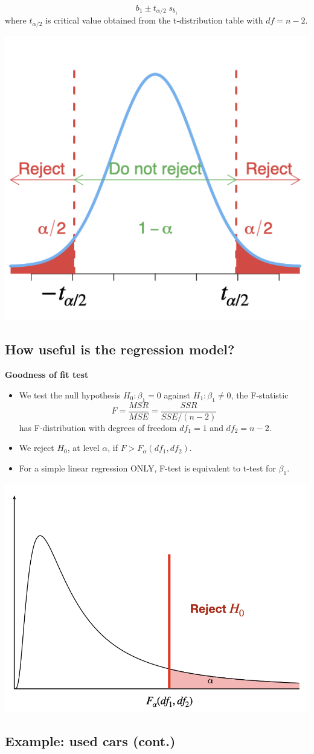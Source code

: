 \documentclass[
]{article}
\begin{document}
\[b_1 \pm t_{\alpha/2} \;s_{b_1}\] where \(t_{\alpha/2}\) is critical
value obtained from the t‐distribution table with \(df=n-2\).

\begin{center}\includegraphics[width=0.3\linewidth,height=0.3\textheight]{figures/Ttest2} \end{center}

\hypertarget{how-useful-is-the-regression-model}{%
\subsection{How useful is the regression
model?}\label{how-useful-is-the-regression-model}}

\textbf{Goodness of fit test}

\begin{itemize}
\item
  We test the null hypothesis \(H_0:\beta_1=0\) against
  \(H_1:\beta_1\neq 0\), the F-statistic
  \[F=\frac{MSR}{MSE}=\frac{SSR}{SSE/(n-2)}\] has F-distribution with
  degrees of freedom \(df_1=1\) and \(df_2=n-2\).
\item
  We reject \(H_0\), at level \(\alpha\), if
  \(F>F_{\alpha}(df_1,df_2)\).
\item
  For a simple linear regression ONLY, F-test is equivalent to t-test
  for \(\beta_1\).
\end{itemize}

\begin{center}\includegraphics[width=0.4\linewidth,height=0.4\textheight]{figures/Ftest} \end{center}

\hypertarget{example-used-cars-cont.-3}{%
\subsection{Example: used cars
(cont.)}\label{example-used-cars-cont.-3}}
\end{document}
